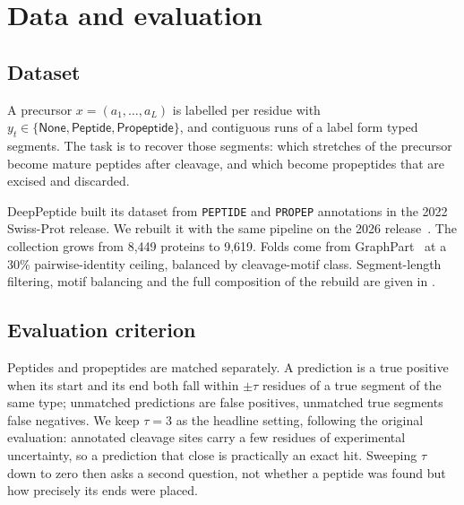 \documentclass{article}
\begin{document}

\section{Data and evaluation}
\label{sec:eval}

\subsection{Dataset}
\label{sec:dataset}
A precursor $x=(a_1,\dots,a_L)$ is labelled per residue with $y_t \in \{\textsf{None},\textsf{Peptide},\textsf{Propeptide}\}$, and contiguous runs of a label form typed segments. The task is to recover those segments: which stretches of the precursor become mature peptides after cleavage, and which become propeptides that are excised and discarded.


DeepPeptide built its dataset from \texttt{PEPTIDE} and \texttt{PROPEP} annotations in the 2022 Swiss-Prot release. We rebuilt it with the same pipeline on the 2026 release~\citep{uniprot2025}. The collection grows from 8{,}449 proteins to 9{,}619.
Folds come from GraphPart~\citep{graphpart2023} at a 30\% pairwise-identity ceiling, balanced by cleavage-motif class. Segment-length filtering, motif balancing and the full composition of the rebuild are given in .

\subsection{Evaluation criterion}
\label{sec:matching}

Peptides and propeptides are matched separately. A prediction is a true positive when its start and its end both fall within $\pm\tau$ residues of a true segment of the same type; unmatched predictions are false positives, unmatched true segments false negatives. We keep $\tau=3$ as the headline setting, following the original evaluation: annotated cleavage sites carry a few residues of experimental uncertainty, so a prediction that close is practically an exact hit. Sweeping $\tau$ down to zero then asks a second question, not whether a peptide was found but how precisely its ends were placed.
\end{document}
